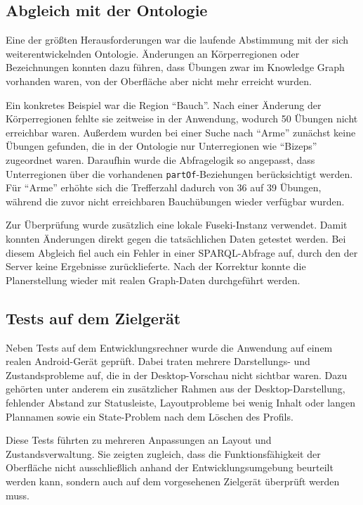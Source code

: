 \subsection{Abgleich mit der Ontologie}
\label{sec:abgleich-ontologie}

Eine der größten Herausforderungen war die laufende Abstimmung mit der sich weiterentwickelnden Ontologie. Änderungen an Körperregionen oder Bezeichnungen konnten dazu führen, dass Übungen zwar im Knowledge Graph vorhanden waren, von der Oberfläche aber nicht mehr erreicht wurden.

Ein konkretes Beispiel war die Region ``Bauch''. Nach einer Änderung der Körperregionen fehlte sie zeitweise in der Anwendung, wodurch 50 Übungen nicht erreichbar waren. Außerdem wurden bei einer Suche nach ``Arme'' zunächst keine Übungen gefunden, die in der Ontologie nur Unterregionen wie ``Bizeps'' zugeordnet waren. Daraufhin wurde die Abfragelogik so angepasst, dass Unterregionen über die vorhandenen \texttt{partOf}-Beziehungen berücksichtigt werden. Für ``Arme'' erhöhte sich die Trefferzahl dadurch von 36 auf 39 Übungen, während die zuvor nicht erreichbaren Bauchübungen wieder verfügbar wurden.

Zur Überprüfung wurde zusätzlich eine lokale Fuseki-Instanz verwendet. Damit konnten Änderungen direkt gegen die tatsächlichen Daten getestet werden. Bei diesem Abgleich fiel auch ein Fehler in einer SPARQL-Abfrage auf, durch den der Server keine Ergebnisse zurücklieferte. Nach der Korrektur konnte die Planerstellung wieder mit realen Graph-Daten durchgeführt werden.

\subsection{Tests auf dem Zielgerät}

Neben Tests auf dem Entwicklungsrechner wurde die Anwendung auf einem realen Android-Gerät geprüft. Dabei traten mehrere Darstellungs- und Zustandsprobleme auf, die in der Desktop-Vorschau nicht sichtbar waren. Dazu gehörten unter anderem ein zusätzlicher Rahmen aus der Desktop-Darstellung, fehlender Abstand zur Statusleiste, Layoutprobleme bei wenig Inhalt oder langen Plannamen sowie ein State-Problem nach dem Löschen des Profils.

Diese Tests führten zu mehreren Anpassungen an Layout und Zustandsverwaltung. Sie zeigten zugleich, dass die Funktionsfähigkeit der Oberfläche nicht ausschließlich anhand der Entwicklungsumgebung beurteilt werden kann, sondern auch auf dem vorgesehenen Zielgerät überprüft werden muss.

